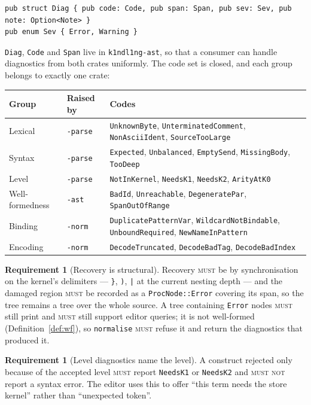 \documentclass[11pt,a4paper]{article}
\newcommand{\code}[1]{\texttt{#1}}
\newcommand{\MUST}{\textsc{must}}
\newcommand{\MUSTNOT}{\textsc{must not}}
\theoremstyle{definition}
\newtheorem{requirement}[definition]{Requirement}
\theoremstyle{plain}
\begin{document}
\begin{lstlisting}
pub struct Diag { pub code: Code, pub span: Span, pub sev: Sev, pub note: Option<Note> }
pub enum Sev { Error, Warning }
\end{lstlisting}

\code{Diag}, \code{Code} and \code{Span} live in \code{k1ndl1ng-ast}, so that a
consumer can handle diagnostics from both crates uniformly. The code set is
closed, and each group belongs to exactly one crate:

\begin{center}
\begin{tabularx}{\linewidth}{@{}ll>{\raggedright\arraybackslash}X@{}}
\toprule
Group & Raised by & Codes\\
\midrule
Lexical & \code{-parse} & \code{UnknownByte}, \code{UnterminatedComment},
\code{NonAsciiIdent}, \code{SourceTooLarge}\\
Syntax & \code{-parse} & \code{Expected}, \code{Unbalanced},
\code{EmptySend}, \code{MissingBody}, \code{TooDeep}\\
Level & \code{-parse} & \code{NotInKernel}, \code{NeedsK1}, \code{NeedsK2},
\code{ArityAtK0}\\
Well-formedness & \code{-ast} & \code{BadId}, \code{Unreachable},
\code{DegeneratePar}, \code{SpanOutOfRange}\\
Binding & \code{-norm} & \code{DuplicatePatternVar},
\code{WildcardNotBindable}, \code{UnboundRequired}, \code{NewNameInPattern}\\
Encoding & \code{-norm} & \code{DecodeTruncated}, \code{DecodeBadTag},
\code{DecodeBadIndex}\\
\bottomrule
\end{tabularx}
\end{center}

\begin{requirement}[Recovery is structural]
Recovery \MUST{} be by synchronisation on the kernel's delimiters ---
\code{\}}, \code{)}, \code{|} at the current nesting depth --- and the damaged
region \MUST{} be recorded as a \code{ProcNode::Error} covering its span, so the
tree remains a tree over the whole source. A tree containing \code{Error} nodes
\MUST{} still print and \MUST{} still support editor queries; it is not
well-formed (Definition~\ref{def:wf}), so \code{normalise} \MUST{} refuse it and
return the diagnostics that produced it.
\end{requirement}

\begin{requirement}[Level diagnostics name the level]
A construct rejected only because of the accepted level \MUST{} report
\code{NeedsK1} or \code{NeedsK2} and \MUSTNOT{} report a syntax error. The
editor uses this to offer ``this term needs the store kernel'' rather than
``unexpected token''.
\end{requirement}
\end{document}
